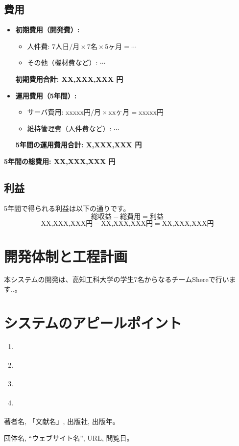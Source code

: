 \documentclass{docs}
\begin{document}
\subsection{費用}
\begin{itemize}
	\item \textbf{初期費用（開発費）:}
		\begin{itemize}
			\item 人件費: $\text{7人日/月}\times\text{7名}\times\text{5ヶ月}=\cdots$
			\item その他（機材費など）: $\cdots$
		\end{itemize}
		\textbf{初期費用合計: XX,XXX,XXX 円}
	\item \textbf{運用費用（5年間）:}
		\begin{itemize}
			\item サーバ費用: $\text{xxxxx円/月}\times\text{xxヶ月}=\text{xxxxx円}$
			\item 維持管理費（人件費など）: $\cdots$
		\end{itemize}
		\textbf{5年間の運用費用合計: X,XXX,XXX 円}
\end{itemize}
\textbf{5年間の総費用: XX,XXX,XXX 円}

\subsection{利益}
5年間で得られる利益は以下の通りです。
$$
\text{総収益} - \text{総費用} = \text{利益}
$$
$$
\text{XX,XXX,XXX円} - \text{XX,XXX,XXX円} = \text{XX,XXX,XXX円}
$$

\section{開発体制と工程計画}

本システムの開発は、高知工科大学の学生7名からなるチームShereで行います..。



\section{システムのアピールポイント}
\begin{enumerate}
	\item \textbf{}
	\item \textbf{}
	\item \textbf{}
	\item \textbf{}
\end{enumerate}

\begin{thebibliography}{99}
	著者名, 「文献名」, 出版社, 出版年。

	団体名, “ウェブサイト名”, URL, 閲覧日。
\end{thebibliography}
\end{document}
